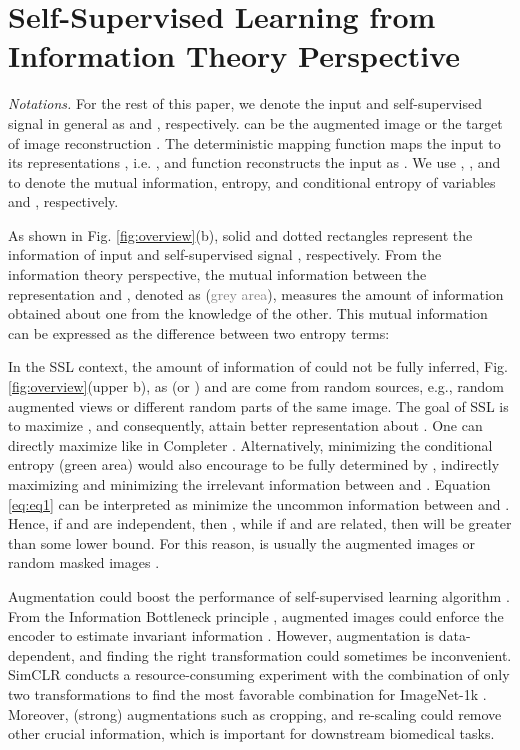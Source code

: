 \documentclass[10pt,twocolumn,letterpaper]{article}
\begin{document}
\section{Self-Supervised Learning from Information Theory Perspective}
\textcolor{nblue}{\textit{Notations.}} For the rest of this paper, we denote the input and self-supervised signal in general as  and , respectively.  can be the augmented image \cite{simclr,moco,dino} or the target of image reconstruction \cite{mae,simmim,beit}. The deterministic mapping function  maps the input  to its representations , i.e. , and function  reconstructs the input as . We use , , and  to denote the mutual information, entropy, and conditional entropy of variables  and , respectively.

As shown in Fig. \ref{fig:overview}(b), solid and dotted rectangles represent the information of input  and self-supervised signal , respectively. From the information theory perspective, the mutual information between the representation  and , denoted as  (\textcolor{gray}{grey area}), measures the amount of information obtained about one from the knowledge of the other. This mutual information can be expressed as the difference between two entropy terms:

In the SSL context, the amount of information of  could not be fully inferred, Fig. \ref{fig:overview}(upper b), as  (or ) and  are come from random sources, e.g., random augmented views or different random parts of the same image. The goal of SSL is to maximize , and consequently, attain better representation about . One can directly maximize  like in Completer \cite{completer}. Alternatively, minimizing the conditional entropy  (green area) \cite{moco,ssl2} would also encourage  to be fully determined by , indirectly maximizing  and minimizing the irrelevant information between  and . Equation \eqref{eq:eq1} can be interpreted as  minimize the uncommon information between  and  \cite{morency,twins}. Hence, if  and  are independent, then , while if  and  are related, then  will be greater than some lower bound. For this reason,  is usually the augmented images \cite{simclr,moco,byol,dino,twins,morency,data2vec} or random masked images \cite{mae,simmim,beit,data2vec}.

Augmentation could boost the performance of self-supervised learning algorithm \cite{simclr,byol,moco}. From the Information Bottleneck principle \cite{ib1}, augmented images could enforce the encoder  to estimate invariant information \cite{mutual}. However, augmentation is data-dependent, and finding the right transformation could sometimes be inconvenient. SimCLR \cite{simclr} conducts a resource-consuming experiment with the combination of only two transformations to find the most favorable combination for ImageNet-1k \cite{imagenet}. Moreover, (strong) augmentations such as cropping, and re-scaling could remove other crucial information, which is important for downstream biomedical tasks. 
\end{document}

